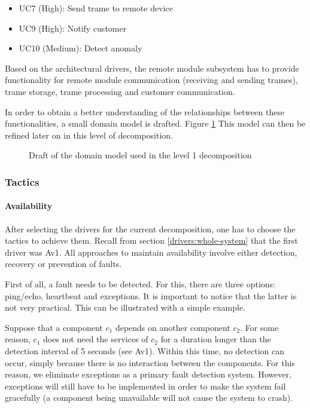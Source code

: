\begin{itemize}
	\item UC7 (High): Send trame to remote device
	\item UC9 (High): Notify customer
	\item UC10 (Medium): Detect anomaly
\end{itemize}

\npar Based on the architectural drivers, the remote module subsystem has to
provide functionality for remote module communication (receiving and sending
trames), trame storage, trame processing and customer communication. 

\npar In order to obtain a better understanding of the relationships between
these functionalities, a small domain model is drafted. Figure
\ref{fig:dec/whole-system/draft} This model can then be refined later on
in this level of decomposition.

\begin{figure}[H]
	\begin{centering}
		\caption{Draft of the domain model used in the level 1 decomposition}
		\label{fig:dec/whole-system/draft}
	\end{centering}
\end{figure}

\subsubsection{Tactics}
\label{tactics:whole-system}

\paragraph{Availability}

\npar After selecting the drivers for the current decomposition, one has to
choose the tactics to achieve them. Recall from section
\ref{drivers:whole-system} that the first driver was Av1. All approaches to
maintain availability involve either detection, recovery or prevention of
faults.

\npar First of all, a fault needs to be detected. For this, there are three
options: ping/echo, heartbeat and exceptions. It is important to notice that the
latter is not very practical. This can be illustrated with a simple example.

\npar Suppose that a component $c_1$ depends on another component $c_2$. For
some reason, $c_1$ does not need the services of $c_2$ for a duration longer
than the detection interval of 5 seconds (see Av1). Within this time, no
detection can occur, simply because there is no interaction between the
components. For this reason, we eliminate exceptions as a primary fault
detection system. However, exceptions will still have to be implemented in order
to make the system fail gracefully (a component being unavailable will not
cause the system to crash).

